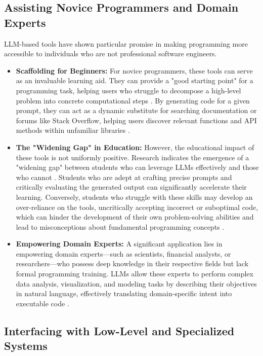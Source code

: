 \documentclass[12pt, a4paper]{report}
\begin{document}
\subsection{Assisting Novice Programmers and Domain Experts}

LLM-based tools have shown particular promise in making programming more accessible to individuals who are not professional software engineers.
\begin{itemize}
    \item \textbf{Scaffolding for Beginners:} For novice programmers, these tools can serve as an invaluable learning aid. They can provide a "good starting point" for a programming task, helping users who struggle to decompose a high-level problem into concrete computational steps \citep{barker2023automatically}. By generating code for a given prompt, they can act as a dynamic substitute for searching documentation or forums like Stack Overflow, helping users discover relevant functions and API methods within unfamiliar libraries \citep{barker2023automatically}.
    \item \textbf{The "Widening Gap" in Education:} However, the educational impact of these tools is not uniformly positive. Research indicates the emergence of a "widening gap" between students who can leverage LLMs effectively and those who cannot \citep{barker2023automatically}. Students who are adept at crafting precise prompts and critically evaluating the generated output can significantly accelerate their learning. Conversely, students who struggle with these skills may develop an over-reliance on the tools, uncritically accepting incorrect or suboptimal code, which can hinder the development of their own problem-solving abilities and lead to misconceptions about fundamental programming concepts \citep{barker2023automatically}.
    \item \textbf{Empowering Domain Experts:} A significant application lies in empowering domain experts—such as scientists, financial analysts, or researchers—who possess deep knowledge in their respective fields but lack formal programming training. LLMs allow these experts to perform complex data analysis, visualization, and modeling tasks by describing their objectives in natural language, effectively translating domain-specific intent into executable code \citep{dibia2023beyond}.
\end{itemize}

\subsection{Interfacing with Low-Level and Specialized Systems}
\end{document}
